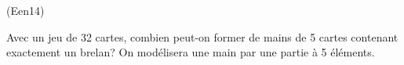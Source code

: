 \begin{tiny}(Een14)\end{tiny} Avec un jeu de 32 cartes, combien peut-on former de mains de 5 cartes contenant exactement un brelan? On modélisera une main par une partie à 5 éléments. 